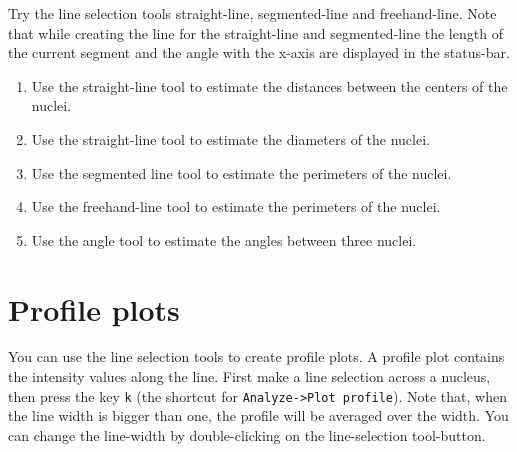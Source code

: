 Try the line selection tools straight-line, segmented-line and freehand-line. Note that while creating the line for the straight-line and segmented-line the length of the current segment and the angle with the x-axis are displayed in 
the status-bar.

\begin{enumerate}
\item Use the straight-line tool to estimate the distances between the centers of the nuclei.
\item Use the straight-line tool to estimate the diameters of the nuclei.
\item Use the segmented line tool to estimate the perimeters of the nuclei.
\item Use the freehand-line tool to estimate the perimeters of the nuclei.
\item Use the angle tool to estimate the angles between three nuclei.
\end{enumerate}

\section{Profile plots}

You can use the line selection tools to create profile plots. A profile plot contains the intensity values along the line. First make a line selection across a nucleus, then press the key \texttt{k} (the shortcut for \texttt{Analyze->Plot profile}). Note that, when the line width is bigger than one, the profile will be averaged over the width. You can change the line-width by double-clicking on the line-selection tool-button.

